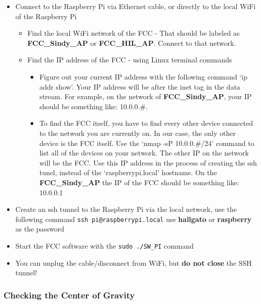 	\begin{itemize}
	\itemsep1pt\parskip0pt
	\item
	  Connect to the Raspberry Pi via Ethernet cable, or directly to the
	  local WiFi of the Raspberry Pi
	
	  \begin{itemize}
	  \itemsep1pt\parskip0pt
	  \item
	    Find the local WiFi network of the FCC - That should be labeled as
	    \textbf{FCC\_Sindy\_AP} or \textbf{FCC\_HIL\_AP}. Connect to that
	    network.
	  \item
	    Find the IP address of the FCC - using Linux terminal commands
	
	    \begin{itemize}
	    \itemsep1pt\parskip0pt
	    \item
	      Figure out your current IP address with the following command `ip
	      addr show'. Your IP address will be after the inet tag in the data
	      stream. For example, on the network of \textbf{FCC\_Sindy\_AP},
	      your IP should be something like: 10.0.0.\#.
	    \item
	      To find the FCC itself, you have to find every other device
	      connected to the network you are currently on. In our case, the
	      only other device is the FCC itself. Use the `nmap -sP
	      10.0.0.\#/24' command to list all of the devices on your network.
	      The other IP on the network will be the FCC. Use this IP address
	      in the process of creating the ssh tunel, instead of the
	      `raspberrypi.local' hostname. On the \textbf{FCC\_Sindy\_AP} the
	      IP of the FCC should be something like: 10.0.0.1
	    \end{itemize}
	  \end{itemize}
	\item
	  Create an ssh tunnel to the Raspberry Pi via the local network, use
	  the following command \texttt{ssh pi@raspberrypi.local} use
	  \textbf{hallgato} or \textbf{raspberry} as the password
	\item
	  Start the FCC software with the \texttt{sudo ./SW\_PI} command
	\item
	  You can unplug the cable/disconnect from WiFi, but \textbf{do not
	  close} the SSH tunnel!
	\end{itemize}
	
	\subsubsection*{Checking the Center of
	Gravity}\label{checking-the-center-of-gravity}
	
